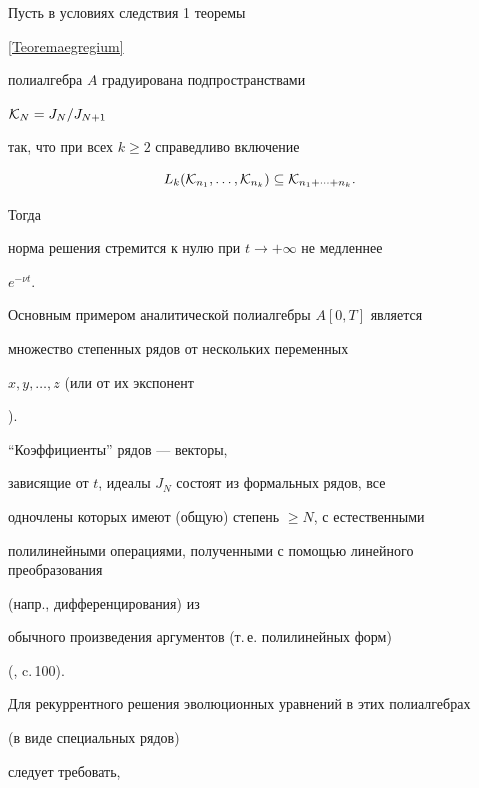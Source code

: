 \begin{cor}


Пусть в условиях следствия 1 теоремы


\ref{Teoremaegregium}


полиалгебра $A$ градуирована подпространствами


${\cal{K}}_N=J_N/J_{N+1}$


так, что при всех $k\geq2$ справедливо включение


$$






L_k({\cal{K}}_{n_1},\dotsc,{\cal{K}}_{n_k})\subseteq


{\cal{K}}_{n_1+\dotsb+n_k}.




$$


Тогда


норма решения стремится к нулю при $t\rightarrow+\infty$ не медленнее


$e^{-\nu t}$.


\end{cor}





Основным примером аналитической полиалгебры $A[0,T]$ является


множество степенных рядов от нескольких переменных


$x, y, \dotsc, z$ (или от их экспонент


\cite{SidorovKorzuninFilimonov}).


``Коэффициенты'' рядов --- векторы,


зависящие от $t$, идеалы $J_N$ состоят из формальных рядов, все


одночлены которых имеют (общую) степень $\geq N$, с естественными


полилинейными операциями, полученными с помощью линейного преобразования


(напр., дифференцирования) из


обычного произведения аргументов (т.\,е. полилинейных форм)


(\cite{5}, c.\,100).


Для рекуррентного решения эволюционных уравнений в этих полиалгебрах


(в виде специальных рядов)


следует требовать,


